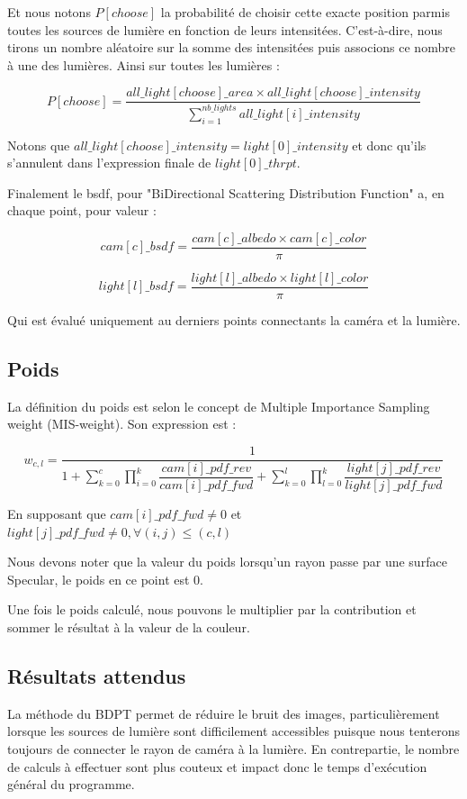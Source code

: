 Et nous notons $P[choose]$ la probabilité de choisir cette exacte position parmis toutes les sources de lumière en fonction de leurs intensitées. C'est-à-dire, nous tirons un nombre aléatoire sur la somme des intensitées puis associons ce nombre à une des lumières. Ainsi sur toutes les lumières :

$$
P[choose] = \dfrac{all\_light[choose]\_area \times all\_light[choose]\_intensity}{\sum_{i=1}^{nb\_lights} all\_light[i]\_intensity}
$$

Notons que $all\_light[choose]\_intensity = light[0]\_intensity$ et donc qu'ils s'annulent dans l'expression finale de $light[0]\_thrpt$.

Finalement le bsdf, pour "BiDirectional Scattering Distribution Function" a, en chaque point, pour valeur :

$$
cam[c]\_bsdf = \dfrac{cam[c]\_albedo \times cam[c]\_color}{\pi}
$$

$$
light[l]\_bsdf = \dfrac{light[l]\_albedo \times light[l]\_color}{\pi}
$$

Qui est évalué uniquement au derniers points connectants la caméra et la lumière. 

\subsection{Poids}

La définition du poids est selon le concept de Multiple Importance Sampling weight (MIS-weight). Son expression est :

$$
w_{c,l} = \dfrac{1}{1 + \sum_{k=0}^{c} \prod_{i=0}^{k} \dfrac{cam[i]\_pdf\_rev}{cam[i]\_pdf\_fwd} + \sum_{k=0}^{l} \prod_{l=0}^{k} \dfrac{light[j]\_pdf\_rev}{light[j]\_pdf\_fwd}}
$$

En supposant que $cam[i]\_pdf\_fwd \neq 0$ et $light[j]\_pdf\_fwd \neq 0, \forall (i,j) \leq (c,l)$

Nous devons noter que la valeur du poids lorsqu'un rayon passe par une surface Specular, le poids en ce point est 0.

Une fois le poids calculé, nous pouvons le multiplier par la contribution et sommer le résultat à la valeur de la couleur.

\subsection{Résultats attendus}

La méthode du BDPT permet de réduire le bruit des images, particulièrement lorsque les sources de lumière sont difficilement accessibles puisque nous tenterons toujours de connecter le rayon de caméra à la lumière. En contrepartie, le nombre de calculs à effectuer sont plus couteux et impact donc le temps d'exécution général du programme.

\pagebreak

